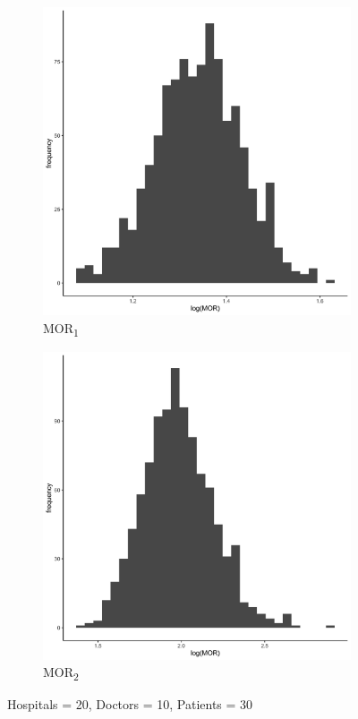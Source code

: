 \documentclass[
  letterpaper,
  DIV=11,
  numbers=noendperiod,
  titlepage]{scrartcl}
\begin{document}
\vspace{10mm}

\begin{figure}
\centering
\begin{subfigure}{.49\textwidth}
    \centering
    \includegraphics[width=.95\linewidth]{../../plots/three-lvl-ran-int/high-prev/hist_20_10_30_three_lvl_high_prev_mor1.png}  
    \caption{MOR\textsubscript{1}}
    \label{l20m10n151}
\end{subfigure}
\begin{subfigure}{.49\textwidth}
    \centering
    \includegraphics[width=.95\linewidth]{../../plots/three-lvl-ran-int/high-prev/hist_20_10_30_three_lvl_high_prev_mor2.png}  
    \caption{MOR\textsubscript{2}}
    \label{l20m10n152}
\end{subfigure}
\caption{Hospitals = 20, Doctors = 10, Patients = 30}
\label{mor1}
\end{figure}
\end{document}
